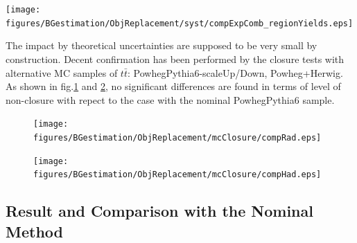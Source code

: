 \texttt{[image: figures/BGestimation/ObjReplacement/syst/compExpComb\_regionYields.eps]}
\label{fig::ObjReplace::syst::result}

\clearpage
The impact by theoretical uncertainties are supposed to be very small by construction. Decent confirmation has been performed by the closure tests with alternative MC samples of $t\bar{t}$: PowhegPythia6-scaleUp/Down, Powheg+Herwig. As shown in fig.\ref{fig::ObjReplace::syst::compRad} and \ref{fig::ObjReplace::syst::compHad}, no significant differences are found in terms of level of non-closure with repect to the case with the nominal PowhegPythia6 sample.

\begin{figure}
  \begin{center}
    \texttt{[image: figures/BGestimation/ObjReplacement/mcClosure/compRad.eps]}
    \label{fig::ObjReplace::syst::compRad}
  \end{center}
\end{figure}
\begin{figure}
  \begin{center}
    \texttt{[image: figures/BGestimation/ObjReplacement/mcClosure/compHad.eps]}
    \label{fig::ObjReplace::syst::compHad}
  \end{center}
\end{figure}






\clearpage
\subsection{Result and Comparison with the Nominal Method} \label{sec::ObjReplace::result}


